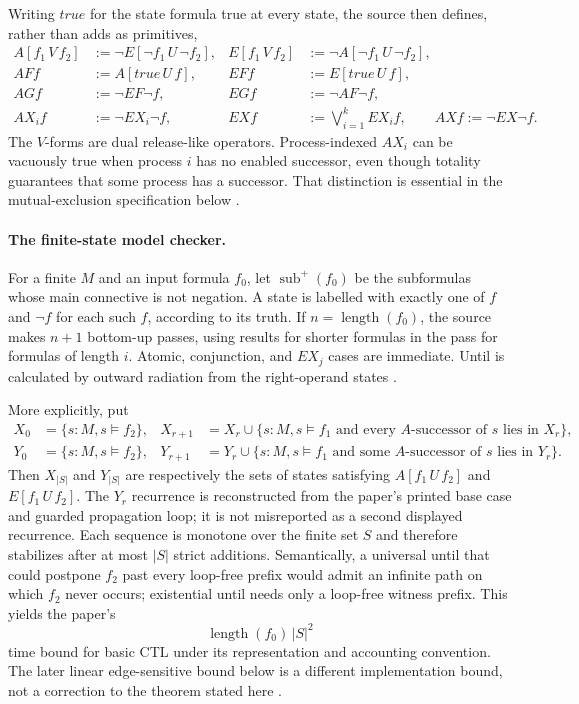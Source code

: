 Writing \(\mathit{true}\) for the state formula true at every state, the
source then defines, rather than adds as primitives,
\[
\begin{aligned}
 A[f_1\,V\,f_2]&:=\neg E[\neg f_1\,U\,\neg f_2],
 &
 E[f_1\,V\,f_2]&:=\neg A[\neg f_1\,U\,\neg f_2],\\
 AFf&:=A[\mathit{true}\,U\,f],
 &
 EFf&:=E[\mathit{true}\,U\,f],\\
 AGf&:=\neg EF\neg f,
 &
 EGf&:=\neg AF\neg f,\\
 AX_i f&:=\neg EX_i\neg f,
 &
 EXf&:=\bigvee_{i=1}^{k}EX_i f,
 \qquad AXf:=\neg EX\neg f.
\end{aligned}
\]
The \(V\)-forms are dual release-like operators.  Process-indexed
\(AX_i\) can be vacuously true when process \(i\) has no enabled successor,
even though totality guarantees that some process has a successor.  That
distinction is essential in the mutual-exclusion specification below
\cite[pp.~55--56]{ClarkeEmerson1981}.

\paragraph{The finite-state model checker.}
For a finite \(M\) and an input formula \(f_0\), let
\(\operatorname{sub}^{+}(f_0)\) be the subformulas whose main connective is
not negation.  A state is labelled with exactly one of \(f\) and \(\neg f\)
for each such \(f\), according to its truth.  If
\(n=\operatorname{length}(f_0)\), the source makes \(n+1\) bottom-up passes,
using results for shorter formulas in the pass for formulas of length \(i\).
Atomic, conjunction, and \(EX_j\) cases are immediate.  Until is calculated
by outward radiation from the right-operand states
\cite[pp.~56--58]{ClarkeEmerson1981}.

More explicitly, put
\[
\begin{aligned}
 X_0&=\{s:M,s\models f_2\},&
 X_{r+1}
   &=X_r\cup
     \{s:M,s\models f_1
       \text{ and every }A\text{-successor of }s\text{ lies in }X_r\},\\
 Y_0&=\{s:M,s\models f_2\},&
 Y_{r+1}
   &=Y_r\cup
     \{s:M,s\models f_1
       \text{ and some }A\text{-successor of }s\text{ lies in }Y_r\}.
\end{aligned}
\]
Then \(X_{\lvert S\rvert}\) and \(Y_{\lvert S\rvert}\) are respectively
the sets of states satisfying \(A[f_1\,U\,f_2]\) and
\(E[f_1\,U\,f_2]\).  The \(Y_r\) recurrence is reconstructed from the
paper's printed base case and guarded propagation loop; it is not misreported
as a second displayed recurrence.  Each sequence is monotone over the finite
set \(S\) and therefore stabilizes after at most \(\lvert S\rvert\) strict
additions.  Semantically, a universal until that could postpone \(f_2\) past
every loop-free prefix would admit an infinite path on which \(f_2\) never
occurs; existential until needs only a loop-free witness prefix.  This yields
the paper's
\[
 \operatorname{length}(f_0)\,\lvert S\rvert^2
\]
time bound for basic CTL under its representation and accounting convention.
The later linear edge-sensitive bound below is a different implementation
bound, not a correction to the theorem stated here
\cite[pp.~56--59]{ClarkeEmerson1981}.

